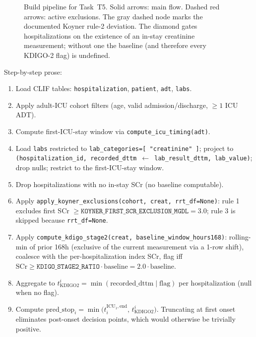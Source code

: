 \documentclass[11pt]{article}
\newcommand{\predstop}{\text{pred\_stop}}
\newcommand{\scr}{\text{SCr}}
\newcommand{\tkdtwo}{t_{\text{KDIGO2}}}
\begin{document}
\begin{figure}[H]
\centering

\caption{Build pipeline for Task~T5. Solid arrows: main flow. Dashed red
arrows: active exclusions. The gray dashed node marks the documented
Koyner rule-2 deviation. The diamond gates hospitalizations on the
existence of an in-stay creatinine measurement; without one the
baseline (and therefore every KDIGO-2 flag) is undefined.}
\label{fig:aki-flow}
\end{figure}

Step-by-step prose:

\begin{enumerate}[leftmargin=2em]
  \item Load CLIF tables: \texttt{hospitalization}, \texttt{patient},
        \texttt{adt}, \texttt{labs}.
  \item Apply adult-ICU cohort filters (age, valid admission/discharge,
        $\geq 1$ ICU ADT).
  \item Compute first-ICU-stay window via
        \texttt{compute\_icu\_timing(adt)}.
  \item Load \texttt{labs} restricted to
        \texttt{lab\_categories=[\,"creatinine"\,]}; project to
        \texttt{(hospitalization\_id,\ recorded\_dttm\ $\leftarrow$
        lab\_result\_dttm,\ lab\_value)}; drop nulls; restrict to the
        first-ICU-stay window.
  \item Drop hospitalizations with no in-stay SCr (no baseline
        computable).
  \item Apply \texttt{apply\_koyner\_exclusions(cohort, creat,
        rrt\_df=None)}: rule 1 excludes first SCr $\geq
        \texttt{KOYNER\_FIRST\_SCR\_EXCLUSION\_MGDL}=3.0$; rule 3 is
        skipped because \texttt{rrt\_df=None}.
  \item Apply \texttt{compute\_kdigo\_stage2(creat,\
        baseline\_window\_hours\=168)}: rolling-min of prior 168h
        (exclusive of the current measurement via a 1-row shift),
        coalesce with the per-hospitalization index SCr, flag iff
        $\scr \ge \texttt{KDIGO\_STAGE2\_RATIO}\cdot\text{baseline}
        = 2.0\cdot\text{baseline}$.
  \item Aggregate to $\tkdtwo^i = \min(\text{recorded\_dttm} \mid
        \text{flag})$ per hospitalization (null when no flag).
  \item Compute $\predstop_i =
        \min\!\bigl(t^{\text{ICU}_1,\text{end}}_i,\, \tkdtwo^i\bigr)$.
        Truncating at first onset eliminates post-onset decision
        points, which would otherwise be trivially positive.

\end{enumerate}
\end{document}

